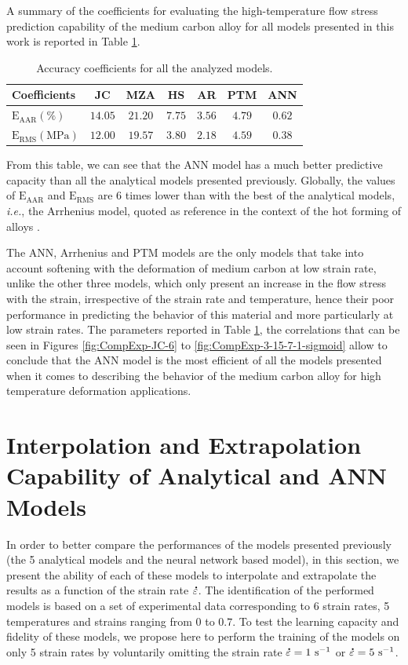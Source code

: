 \documentclass[twoside,english,1p,final,sort&compress]{elsarticle}
\makeatletter
\theoremstyle{plain}
\DeclareRobustCommand{\mdot}[1]{\accentset{\mbox{\bfseries .}}{#1}}
\DeclareRobustCommand{\ie}{\emph{i.e.}\@\xspace}
\DeclareRobustCommand{\RMSE}{\text{E}_\text{RMS}}
\DeclareRobustCommand{\AARE}{\text{E}_\text{AAR}}
\DeclareRobustCommand{\ps}{\text{s}^{-1}}
\DeclareRobustCommand{\MPa}{\text{MPa}}
\makeatother
\begin{document}
A summary of the coefficients for evaluating the high-temperature flow stress prediction capability of the medium carbon alloy for all models presented in this work is reported in Table \ref{tab:Errors}.
\begin{table}[h!]
\centering
\caption{Accuracy coefficients for all the analyzed models.}
\begin{tabular}{lcccccc}
	\hline
	Coefficients        &   JC    &   MZA   &   HS   &   AR   &  PTM   &  ANN   \\ \hline
	$\AARE(\%)$         & $14.05$ & $21.20$ & $7.75$ & $3.56$ & $4.79$ & $0.62$ \\
	$\RMSE(\MPa)$ & $12.00$ & $19.57$ & $3.80$ & $2.18$ & $4.59$ & $0.38$ \\ \hline
\end{tabular}
\label{tab:Errors}
\end{table}
From this table, we can see that the ANN model has a much better predictive capacity than all the analytical models presented previously. Globally, the values of $\AARE$ and $\RMSE$ are $6$ times lower than with the best of the analytical models, \ie, the Arrhenius model, quoted as reference in the context of the hot forming of alloys \cite{Liang-2022}.

The ANN, Arrhenius and PTM models are the only models that take into account softening with the deformation of medium carbon at low strain rate, unlike the other three models, which only present an increase in the flow stress with the strain, irrespective of the strain rate and temperature, hence their poor performance in predicting the behavior of this material and more particularly at low strain rates.
The parameters reported in Table \ref{tab:Errors}, the correlations that can be seen in Figures \ref{fig:CompExp-JC-6} to \ref{fig:CompExp-3-15-7-1-sigmoid} allow to conclude  that the ANN model is the most efficient of all the models presented when it comes to describing the behavior of the medium carbon alloy for high temperature deformation applications.

\section{Interpolation and Extrapolation Capability of Analytical and ANN Models \label{sec:IntExt}}

In order to better compare the performances of the models presented previously (the 5 analytical models and the neural network based model), in this section, we present the ability of each of these models to interpolate and extrapolate the results as a function of the strain rate $\mdot\varepsilon$.
The identification of the performed models is based on a set of experimental data corresponding to 6 strain rates, 5 temperatures and strains ranging from $0$ to $0.7$. To test the learning capacity and fidelity of these models, we propose here to perform the training of the models on only 5 strain rates by voluntarily omitting the strain rate $\mdot\varepsilon=1~\ps$ or $\mdot\varepsilon=5~\ps$.
\end{document}
